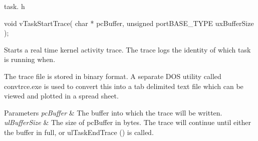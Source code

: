 task. h 
\begin{DoxyPre}void vTaskStartTrace( char * pcBuffer, unsigned portBASE\_TYPE uxBufferSize );\end{DoxyPre}


Starts a real time kernel activity trace. The trace logs the identity of which task is running when.

The trace file is stored in binary format. A separate D\-O\-S utility called convtrce.\-exe is used to convert this into a tab delimited text file which can be viewed and plotted in a spread sheet.


\begin{DoxyParams}{Parameters}
{\em pc\-Buffer} & The buffer into which the trace will be written.\\
\hline
{\em ul\-Buffer\-Size} & The size of pc\-Buffer in bytes. The trace will continue until either the buffer in full, or ul\-Task\-End\-Trace () is called. \\
\hline
\end{DoxyParams}
